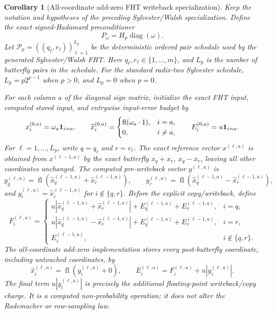 \documentclass[11pt]{article}
\newcommand{\fl}{\operatorname{fl}}
\newcommand{\diag}{\operatorname{diag}}
\newtheorem{corollary}[theorem]{Corollary}
\theoremstyle{remark}
\begin{document}
\begin{corollary}[All-coordinate add-zero FHT writeback specialization]
Keep the notation and hypotheses of the preceding Sylvester/Walsh
specialization.  Define the exact signed-Hadamard preconditioner
\[
  P_\omega=H_p\diag(\omega).
\]
Let \(\mathcal P_p=((q_\ell,r_\ell))_{\ell=1}^{L_p}\) be the deterministic
ordered pair schedule used by the generated Sylvester/Walsh FHT.  Here
\(q_\ell,r_\ell\in\{1,\ldots,m\}\), and \(L_p\) is the number of butterfly
pairs in the schedule.  For the standard radix-two Sylvester schedule,
\(L_p=p2^{p-1}\) when \(p>0\), and \(L_p=0\) when \(p=0\).

For each column \(a\) of the diagonal sign matrix, initialize the exact FHT
input, computed stored input, and entrywise input-error budget by
\[
  x_i^{(0,a)}=\omega_a{\bf 1}_{i=a},\qquad
  \widehat x_i^{(0,a)}
  =
  \begin{cases}
    \fl(\omega_a\cdot 1),& i=a,\\
    0,& i\ne a,
  \end{cases}
  \qquad
  E_i^{(0,a)}=u{\bf 1}_{i=a}.
\]
For \(\ell=1,\ldots,L_p\), write \(q=q_\ell\) and \(r=r_\ell\).  The exact
reference vector \(x^{(\ell,a)}\) is obtained from \(x^{(\ell-1,a)}\) by the
exact butterfly \(x_q+x_r\), \(x_q-x_r\), leaving all other coordinates
unchanged.  The computed pre-writeback vector \(y^{(\ell,a)}\) is
\[
  y_q^{(\ell,a)}
    =\fl(\widehat x_q^{(\ell-1,a)}+\widehat x_r^{(\ell-1,a)}),
  \qquad
  y_r^{(\ell,a)}
    =\fl(\widehat x_q^{(\ell-1,a)}-\widehat x_r^{(\ell-1,a)}),
\]
and \(y_i^{(\ell,a)}=\widehat x_i^{(\ell-1,a)}\) for \(i\notin\{q,r\}\).
Before the explicit copy/writeback, define
\[
  F_i^{(\ell,a)}
  =
  \begin{cases}
    u|\widehat x_q^{(\ell-1,a)}+\widehat x_r^{(\ell-1,a)}|
      +E_q^{(\ell-1,a)}+E_r^{(\ell-1,a)},& i=q,\\
    u|\widehat x_q^{(\ell-1,a)}-\widehat x_r^{(\ell-1,a)}|
      +E_q^{(\ell-1,a)}+E_r^{(\ell-1,a)},& i=r,\\
    E_i^{(\ell-1,a)},& i\notin\{q,r\}.
  \end{cases}
\]
The all-coordinate add-zero implementation stores every post-butterfly
coordinate, including untouched coordinates, by
\[
  \widehat x_i^{(\ell,a)}=\fl(y_i^{(\ell,a)}+0),
  \qquad
  E_i^{(\ell,a)}
    =
    F_i^{(\ell,a)}+u|y_i^{(\ell,a)}|.
\]
The final term \(u|y_i^{(\ell,a)}|\) is precisely the additional
floating-point writeback/copy charge.  It is a computed non-probability
operation; it does not alter the Rademacher or row-sampling law.


\end{corollary}
\end{document}
